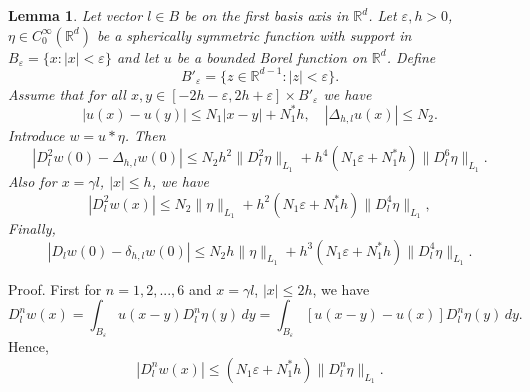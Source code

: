 \documentclass[11pt, reqno]{amsart}
\newtheorem{lemma}[theorem]{Lemma}
\theoremstyle{definition}
\theoremstyle{remark}
\begin{document}
\begin{lemma}
                                          \label{lemma 7.1.1}
Let vector $l\in B$ be on the first basis axis in ${\mathbb{R}}^{d}$.
Let $\varepsilon,h>0$,
$\eta\in C^{\infty}_{0}({\mathbb{R}}^{d})$ be a
spherically symmetric function
with support in $B_{\varepsilon}=\{x:|x|<\varepsilon\}$
    and let
$u$ be a bounded Borel function on ${\mathbb{R}}^{d}$. Define
$$
B'_{\varepsilon}=\{z\in{\mathbb{R}}^{d-1}:|z|<\varepsilon\}.
$$
Assume that for all $x,y \in[- 2h -\varepsilon ,  2h +\varepsilon   ]\times B'_{\varepsilon}$  
  we have
\begin{equation}
                                             \label{7.1.2}
|u(x )-u(y)|\leq N_{1} |x-y|+N_{1}^{*}h,\quad
|\Delta_{h,l}u(x)|\leq N_{2} .
\end{equation}
Introduce $w=u*\eta$. Then 
\begin{equation}
                                             \label{7.2.7}
|D_{l}^{2}w(0)-\Delta_{h,l}w(0)|\leq N_{2}h^{2} 
\|D^{2}_{l}\eta\|_{L_{1}}
+ h^{4}(N_{1}\varepsilon+N_{1}^{*}h) \|D^{6}_{l}\eta\|_{L_{1}}  .
\end{equation}
Also for $x=\gamma l$, $|x|\leq h$, we have
\begin{equation}
                                             \label{7.4.1}
|D_{l}^{2}w(x)| \leq N_{2}\|\eta\|_{L_{1}} + 
 h^{2}(N_{1}\varepsilon+N_{1}^{*}h) \|D^{4}_{l}\eta\|_{L_{1}}  ,
\end{equation}
Finally,
\begin{equation}
                                             \label{7.2.8}
|D_{l} w(0)-\delta_{h,l}w(0)|\leq
N_{2}h\|\eta\|_{L_{1}}
+ h^{3}(N_{1}\varepsilon+N_{1}^{*}h) \|D^{4}_{l}\eta\|_{L_{1}}.
\end{equation}
 

 

 
\end{lemma}

Proof. First for $n=1,2,...,6$ and $x=\gamma l  $, $|x|\leq 2h$,
we have
$$
D^{n}_{l}w(x)=\int_{B_{\varepsilon}}u(x-y)D^{n}_{l}\eta(y)\,dy=
\int_{B_{\varepsilon}}[u(x-y)-u(x)]D^{n}_{l}\eta(y)\,dy.
$$
Hence,
\begin{equation}
                                             \label{7.1.3}
|D^{n}_{l}w(x)|\leq (N_{1}\varepsilon+N_{1}^{*}h)
\|D^{n}_{l}\eta\|_{L_{1}}.
\end{equation}
\end{document}
